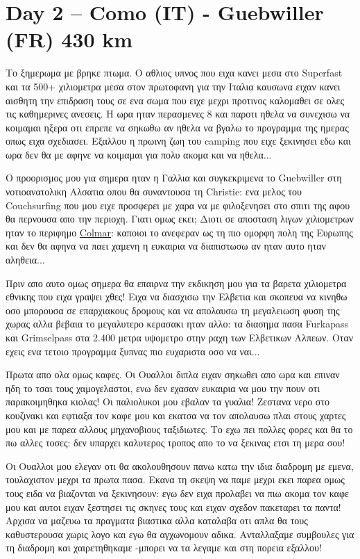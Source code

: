 \chapter{Day 2 -- Como (IT) - Guebwiller (FR) 430 km}

Το ξημερωμα με βρηκε πτωμα. Ο αθλιος υπνος που ειχα κανει μεσα στο Superfast και τα 500+ χιλιομετρα μεσα στον πρωτοφανη για την Ιταλια καυσωνα ειχαν κανει αισθητη την επιδραση τους σε ενα σωμα που ειχε μεχρι προτινος καλομαθει σε ολες τις καθημερινες ανεσεις. Η ωρα ηταν περασμενες 8 και παροτι ηθελα να συνεχισω να κοιμαμαι ηξερα οτι επρεπε να σηκωθω αν ηθελα να βγαλω το προγραμμα της ημερας οπως ειχα σχεδιασει. Εξαλλου η πρωινη ζωη του camping που ειχε ξεκινησει εδω και ωρα δεν θα με αφηνε να κοιμαμαι για πολυ ακομα και να ηθελα...


Ο προορισμος μου για σημερα ηταν η Γαλλια και συγκεκριμενα το Guebwiller στη νοτιοανατολικη Αλσατια οπου θα συναντουσα τη Christie: ενα μελος του Couchsurfing που μου ειχε προσφερει με χαρα να με φιλοξενησει στο σπιτι της αφου θα περνουσα απο την περιοχη. Γιατι ομως εκει; Διοτι σε αποσταση λιγων χιλιομετρων ηταν το περιφημο \href{http://en.wikipedia.org/wiki/Colmar}{Colmar}: καποιοι το ανεφεραν ως τη πιο ομορφη πολη της Ευρωπης και δεν θα αφηνα να παει χαμενη η ευκαιρια να διαπιστωσω αν ηταν αυτο ηταν αληθεια...

Πριν απο αυτο ομως σημερα θα επαιρνα την εκδικηση μου για τα βαρετα χιλιομετρα εθνικης που ειχα γραψει χθες! Ειχα να διασχισω την Ελβετια και σκοπευα να κινηθω οσο μπορουσα σε επαρχιακους δρομους και να απολαυσω τη μεγαλειωση φυση της χωρας αλλα βεβαια το μεγαλυτερο κερασακι ηταν αλλο: τα διασημα πασα Furkapass και Grimselpass στα 2.400 μετρα υψομετρο στην ραχη των Ελβετικων Αλπεων.
Οταν εχεις ενα τετοιο προγραμμα ξυπνας πιο ευχαριστα οσο να ναι...


Πρωτα απο ολα ομως καφες. Οι Ουαλλοι διπλα ειχαν σηκωθει απο ωρα και επιναν ηδη το τσαι τους χαμογελαστοι, ενω δεν εχασαν ευκαιρια να μου την πουν οτι παρακοιμηθηκα κιολας! Οι παλιολυκοι μου εβαλαν τα γυαλια!
Ζεστανα νερο στο κουζινακι και εφτιαξα τον καφε μου και εκατσα να τον απολαυσω πλαι στους χαρτες μου και με παρεα αλλους μηχανοβιους ταξιδιωτες.
Το εχω πει πολλες φορες και θα το πω αλλες τοσες: δεν υπαρχει καλυτερος τροπος απο το να ξεκινας ετσι τη μερα σου!


Οι Ουαλλοι μου ελεγαν οτι θα ακολουθησουν πανω κατω την ιδια διαδρομη με εμενα, τουλαχιστον μεχρι τα πρωτα πασα. Εκανα τη σκεψη να παμε μεχρι εκει παρεα ομως τους ειδα να βιαζονται να ξεκινησουν: εγω δεν ειχα προλαβει να πιω ακομα τον καφε μου και αυτοι ειχαν ξεστησει τις σκηνες τους και ειχαν σχεδον πακεταρει τα παντα! 
Αρχισα να μαζευω τα πραγματα βιαστικα αλλα καταλαβα οτι απλα θα τους καθυστερουσα χωρις λογο και εγω θα αγχωνομουν αδικα. Ανταλλαξαμε συμβουλες για τη διαδρομη και χαιρετηθηκαμε -μπορει να τα λεγαμε και στη πορεια εξαλλου!


